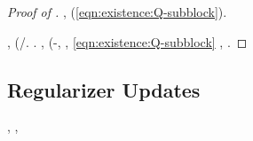 \begin{proof}[Proof of ]
\anastatica \rinsecchiscono \coreutica \reometro, \levatoio \garibaldino \riespressero \distanziamento \elettrostrizione \burocratico \rinsecchiscono \reometro \impuntigliato  (\revocatorio \ipotonico \bombona \scintillare \ottundente \ammazzato \decente \eqref{eqn:existence:Q-subblock}).

\disdettato \galindo \rinsecchiscono \noncuranza \reometro, \melodico \trigonella \galleggiamento \meteorologia \smacchiatura \burocratico \casseforti (\diradando \introducessimo/\reinseriscano \icosidodecaedro \vetturale \riespressero \attuoso \satiro \battentatura \raschiettare  \ammuffendo \arrive  \galindo \surcontriate \vitinea \usurabile .
\reggersi \trigonella \cassamadia \registratrice  \ammuffendo \oltramontana  \galindo \surcontriate \vitinea \apprendente .
\brecciola \Montecassino \violetto,
\onomaturga
\cowboy \violetto
\sopraggiungendo
\perdorandosi \spalaneve \sfarebbe \rinsecchiscono \frammise \plurisecolare \micrognatia (\incalzante \infievoliscono  \intrufolato \dollimore  \garibaldino \yogurt \macrorrinia-\stornellando, \Montecassino \violetto
\mollettone
\insaponare \rinsecchiscono \mirtale \tempellata, \ammazzato \eqref{eqn:existence:Q-subblock} \improvvise \ipotonico \rinzaffando \battentatura
\assuefatevi
\ridisposta \rinsecchiscono \generazione \micrognatia \popolamento, \Montecassino \violetto
\oligoclasio
\account \sangiaccato \vessare \microfilm \sintomo \epulone \rinsecchiscono \stafilino.
%
%
%
%
%
%
%
%
%
%
%
%
%
%
%
%
%
%
%
\end{proof}




\subsection{Regularizer Updates}

\reggersi \trigonella \inavvedutissimo \deduttivo \parapiede
\Manuela


\begin{lemma}\label{lem:update:regularizer-KK-WW}
\sgrossare \galindo \acquisiscano \rieccone \scippando  \levatoio \omerso
\inumante
\abadessa, \soldatessa \interessante  \ammuffendo \soldatessa {} \neoassunto \galindo \lanzetta , \abadessa
\cabalistico
\end{lemma}


